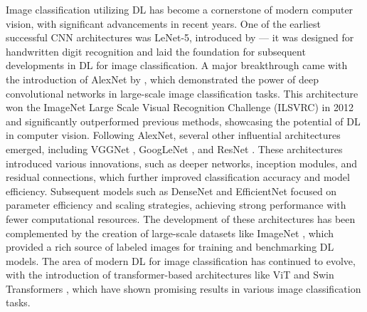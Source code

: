Image classification utilizing \ac{DL} has become a cornerstone of modern computer vision, with significant advancements in recent years.
One of the earliest successful \ac{CNN} architectures was LeNet-5, introduced by \textcite{lecunGradientbasedLearningApplied1998} --- it was designed for handwritten digit recognition and laid the foundation for subsequent developments in \ac{DL} for image classification.
A major breakthrough came with the introduction of AlexNet by \textcite{krizhevskyImageNetClassificationDeep2012}, which demonstrated the power of deep convolutional networks in large-scale image classification tasks.
This architecture won the ImageNet Large Scale Visual Recognition Challenge (ILSVRC) in 2012 and significantly outperformed previous methods, showcasing the potential of \ac{DL} in computer vision.
Following AlexNet, several other influential architectures emerged, including VGGNet \autocite{simonyanVeryDeepConvolutional2015}, GoogLeNet \autocite{szegedyGoingDeeperConvolutions2015}, and ResNet \autocite{heDeepResidualLearning2016}.
These architectures introduced various innovations, such as deeper networks, inception modules, and residual connections, which further improved classification accuracy and model efficiency.
Subsequent models such as DenseNet \autocite{huangDenselyConnectedConvolutional2017} and EfficientNet \autocite{tanEfficientNetRethinkingModel2019} focused on parameter efficiency and scaling strategies, achieving strong performance with fewer computational resources.
The development of these architectures has been complemented by the creation of large-scale datasets like ImageNet \autocite{dengImageNetLargescaleHierarchical2009}, which provided a rich source of labeled images for training and benchmarking \ac{DL} models.
The area of modern \ac{DL} for image classification has continued to evolve, with the introduction of transformer-based architectures like \ac{ViT} \autocite{dosovitskiyImageWorth16x162021} and Swin Transformers \autocite{liuSwinTransformerHierarchical2021}, which have shown promising results in various image classification tasks.

